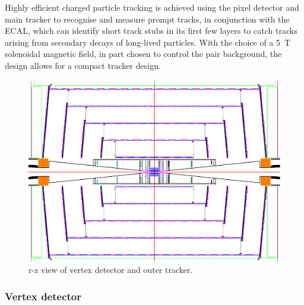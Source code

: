 Highly efficient charged particle tracking is achieved using the pixel detector
and main tracker to recognise and measure prompt tracks, in conjunction with the ECAL, which can
identify short track stubs in its first few layers 
to catch tracks arising from secondary decays of long-lived particles. With
the choice of a 5~T solenoidal magnetic field, in part chosen to control the \epem pair
background, the design allows for a compact tracker design. 

\begin{figure}[tb]
 \begin{center}
 \includegraphics[width=0.9\hsize]{chapters/figures/vxdtrk.pdf}
\caption{r-z view of vertex detector and outer tracker.
\label{fig_vxdtrk}}
 \end{center}
 \vspace{-0.7cm}
 \end{figure}

\subsubsection{Vertex detector}

